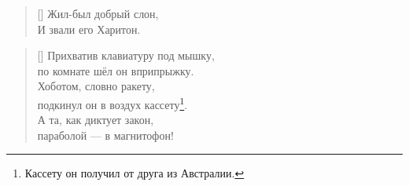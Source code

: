 \documentclass[14pt]{memoir}
\begin{document}
\clearpage
\hfill
\clearpage

\BgThispage

\PlainPoemTitle
{}
\settowidth{\versewidth}{Серый кот - господин Мыцумото.}
\begin{verse}[\versewidth]
Жил-был добрый слон,\\
И звали его Харитон.
\end{verse}

\begin{verse}[\versewidth]
Прихватив клавиатуру под мышку,\\
по комнате шёл он вприпрыжку.\\
Хоботом, словно ракету,\\
подкинул он в воздух кассету\footnote{Кассету он получил от друга из Австралии.}.\\
А та, как диктует закон,\\
параболой --- в магнитофон!
\end{verse}
\end{document}
